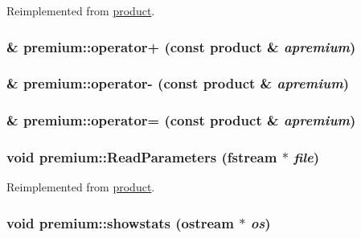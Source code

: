 Reimplemented from \hyperlink{classproduct_afcbfb1feadfd4ed057845eab47e37ff5}{product}.\hypertarget{classpremium_ad0ec34d64c73d308689635c5619a5dba}{
\subsubsection[{operator+}]{ \& premium::operator+ (const {\bf product} \& {\em apremium})}}
\label{classpremium_ad0ec34d64c73d308689635c5619a5dba}
\hypertarget{classpremium_a2b0ea62d5e95b5655d461141e3702779}{
\subsubsection[{operator-\/}]{ \& premium::operator-\/ (const {\bf product} \& {\em apremium})}}
\label{classpremium_a2b0ea62d5e95b5655d461141e3702779}
\hypertarget{classpremium_af03bab06ac59b354df62a220f1052717}{
\subsubsection[{operator=}]{ \& premium::operator= (const {\bf product} \& {\em apremium})}}
\label{classpremium_af03bab06ac59b354df62a220f1052717}
\hypertarget{classpremium_a2c3bdadfb21fa893c4cd2e2f183edcd3}{
\subsubsection[{ReadParameters}]{\setlength{\rightskip}{0pt plus 5cm}void premium::ReadParameters (fstream $\ast$ {\em file})}}
\label{classpremium_a2c3bdadfb21fa893c4cd2e2f183edcd3}


Reimplemented from \hyperlink{classproduct_a1edb3e3d0619a2db8b8f1c95fed582ce}{product}.\hypertarget{classpremium_a69f4bbe9223ea34bddbe6db348670338}{
\subsubsection[{showstats}]{\setlength{\rightskip}{0pt plus 5cm}void premium::showstats (ostream $\ast$ {\em os})}}
\label{classpremium_a69f4bbe9223ea34bddbe6db348670338}


